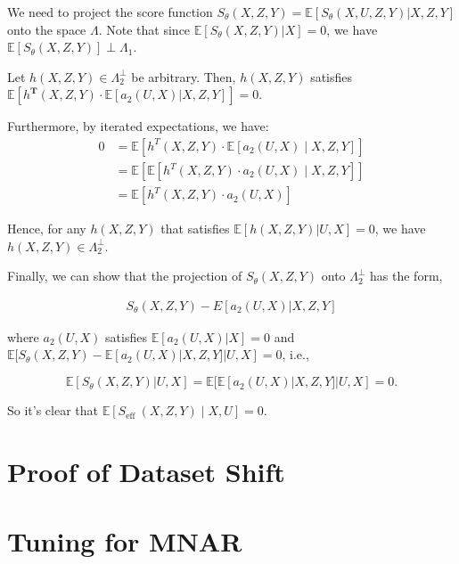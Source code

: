 \documentclass[11pt]{article}
\begin{document}
We need to project the score function $S_{\theta}(X,Z,Y) =\mathbb{E}[S_{\theta}(X,U,Z,Y)|X,Z,Y]$ onto the space $\Lambda$. Note that since $\mathbb{E}[S_{\theta}(X,Z,Y)|X] = 0$, we have $\mathbb{E}[S_{\theta}(X,Z,Y)]\perp \Lambda_1$.

Let $h(X,Z,Y) \in \Lambda^{\perp}_2$ be arbitrary. Then, $h(X,Z,Y)$ satisfies $\mathbb{E}[h^{\mathbf{T}}(X,Z,Y) ·\mathbb{E}[a_2(U,X)|X,Z,Y]] = 0$. 

Furthermore, by iterated expectations, we have:
$$
\begin{aligned}
0 & =\mathbb{E}\left[h^T(X, Z, Y) \cdot \mathbb{E}\left[a_2(U, X) \mid X, Z, Y\right]\right] \\
& =\mathbb{E}\left[\mathbb{E}\left[h^T(X, Z, Y) \cdot a_2(U, X) \mid X, Z, Y\right]\right] \\
& =\mathbb{E}\left[h^T(X, Z, Y) \cdot a_2(U, X)\right]
\end{aligned}
$$

Hence, for any $h(X,Z,Y)$ that satisfies $\mathbb{E}[h(X,Z,Y)|U,X] = 0$, we have $h(X,Z,Y)\in \Lambda^{\perp}_2$. 

Finally, we can show that the projection of $S_{\theta}(X,Z,Y)$ onto $\Lambda^{\perp}_2$ has the form,

\begin{align*}
S_{\theta} (X,Z,Y)−E[a_2 (U,X) | X,Z,Y]
\end{align*}

where $a_2(U,X)$ satisfies $\mathbb{E}[a_2(U,X)|X] = 0$ and $\mathbb{E}[S_{\theta}(X,Z,Y)−\mathbb{E}[a_2(U,X)|X,Z,Y]|U,X] = 0$, i.e.,

$$
\mathbb{E}[S_{\theta}(X,Z,Y)|U,X] = \mathbb{E}[\mathbb{E}[a_2(U,X)|X,Z,Y]|U,X] = 0.
$$

So it's clear that $\mathbb{E}\left[S_{\text {eff }}(X, Z, Y) \mid X, U\right]=0$.

\section{Proof of Dataset Shift}
\label{shift_proof}

\section{Tuning for MNAR}
\label{tuning_1}
\end{document}
